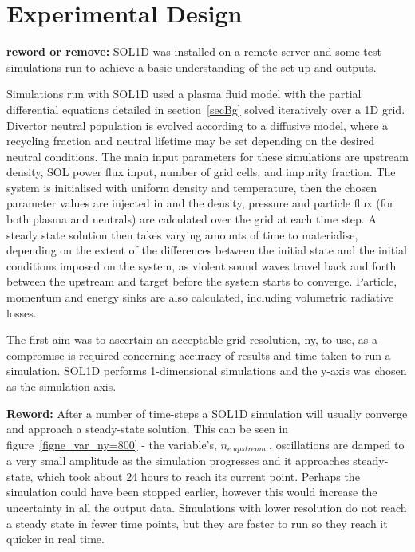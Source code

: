 \documentclass[12pt]{article}  %
\providecommand{\neupstream}{$n_{e~upstream}~$} %
\begin{document}
\section{Experimental Design}\label{secExpt}
\textbf{reword or remove:} SOL1D was installed on a remote server and some test simulations run to achieve a basic understanding of the set-up and outputs. 

Simulations run with SOL1D used a plasma fluid model with the partial differential equations detailed in section~\ref{secBg} solved iteratively over a 1D grid. Divertor neutral population is evolved according to a diffusive model, where a recycling fraction and neutral lifetime may be set depending on the desired neutral conditions. The main input parameters for these simulations are upstream density, SOL power flux input, number of grid cells, and impurity fraction. The system is initialised with uniform density and temperature, then the chosen parameter values are injected in and the density, pressure and particle flux (for both plasma and neutrals) are calculated over the grid at each time step. A steady state solution then takes varying amounts of time to materialise, depending on the extent of the differences between the initial state and the initial conditions imposed on the system, as violent sound waves travel back and forth between the upstream and target before the system starts to converge. Particle, momentum and energy sinks are also calculated, including volumetric radiative losses.

The first aim was to ascertain an acceptable grid resolution, ny, to use, as a compromise is required concerning accuracy of results and time taken to run a simulation. SOL1D performs 1-dimensional simulations and the y-axis was chosen as the simulation axis. 

\textbf{Reword:} After a number of time-steps a SOL1D simulation will usually converge and approach a steady-state solution. This can be seen in figure~\ref{figne_var_ny=800} - the variable's, \neupstream, oscillations are damped to a very small amplitude as the simulation progresses and it approaches steady-state, which took about 24 hours to reach its current point. Perhaps the simulation could have been stopped earlier, however this would increase the uncertainty in all the output data. Simulations with lower resolution do not reach a steady state in fewer time points, but they are faster to run so they reach it quicker in real time.
\end{document}
